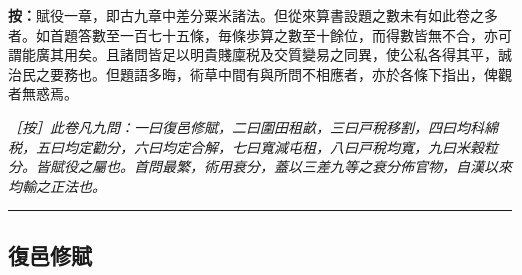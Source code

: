 \documentclass[11pt,a4paper]{article}
\newcommand{\longline}{\noindent\rule{\textwidth}{0.4pt}}
\newcommand{\EditorialNote}[1]{\par\noindent\textit{［按］#1}\par}
\begin{document}
\noindent\textbf{按：}賦役一章，即古九章中差分粟米諸法。但從來算書設題之數未有如此卷之多者。如首題答數至一百七十五條，毎條歩算之數至十餘位，而得數皆無不合，亦可謂能廣其用矣。且諸問皆足以明貴賤廩税及交質變易之同異，使公私各得其平，誠治民之要務也。但題語多晦，術草中間有與所問不相應者，亦於各條下指出，俾觀者無惑焉。

\EditorialNote{此卷凡九問：一曰復邑修賦，二曰圍田租畝，三曰戸稅移割，四曰均科綿税，五曰均定勸分，六曰均定合解，七曰寬減屯租，八曰戸稅均寬，九曰米榖粒分。皆賦役之屬也。首問最繁，術用衰分，蓋以三差九等之衰分佈官物，自漢以來均輸之正法也。}

\longline

\subsection*{\color{sectioncolor}復邑修賦}
\end{document}
